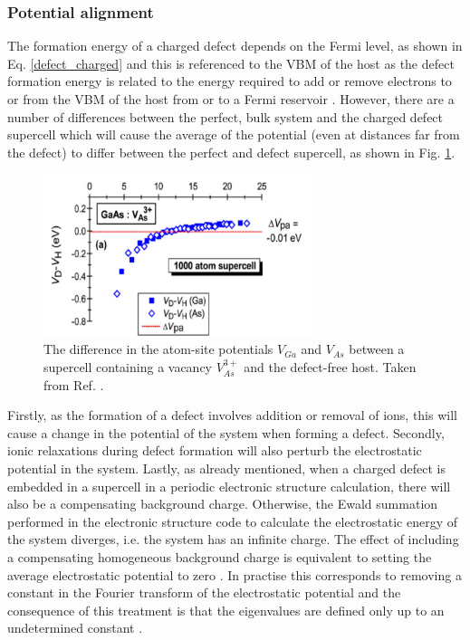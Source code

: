 \documentclass[11pt, twoside]{report}
\begin{document}
\subsubsection{Potential alignment}
The formation energy of a charged defect depends on the Fermi level, as shown in Eq. \ref{defect_charged} and this is referenced to the VBM of the host as the defect formation energy is related to the energy required to add or remove electrons to or from the VBM of the host from or to a Fermi reservoir \cite{Alex_defects}.
However, there are a number of differences between the perfect, bulk system and the charged defect supercell which will cause the average of the potential (even at distances far from the defect) to differ between the perfect and defect supercell, as shown in Fig. \ref{pa}.
\begin{figure}[h!]
  \centering
    \includegraphics[width=0.7\textwidth]{figures/pa.png}
    \caption[The difference in the atom-site potentials $V_{Ga}$ and $V_{As}$ between a supercell containing a vacancy $V_{As}^{3+}$ and the defect-free host.]{The difference in the atom-site potentials $V_{Ga}$ and $V_{As}$ between a supercell containing a vacancy $V_{As}^{3+}$ and the defect-free host. Taken from Ref. .}
  \label{pa}
\end{figure}

Firstly, as the formation of a defect involves addition or removal of ions, this will cause a change in the potential of the system when forming a defect. Secondly, ionic relaxations during defect formation will also perturb the electrostatic potential in the system. Lastly, as already mentioned, when a charged defect is embedded in a supercell in a periodic electronic structure calculation, there will also be a compensating background charge. Otherwise, the Ewald summation performed in the electronic structure code to calculate the electrostatic energy of the system diverges, i.e. the system has an infinite charge. The effect of including a compensating homogeneous background charge is equivalent to setting the average electrostatic potential to zero \cite{freysoldt_rev}. 
In practise this corresponds to removing a constant in the Fourier transform of the electrostatic potential and the consequence of this treatment is that the eigenvalues are defined only up to an undetermined constant \cite{kumagai_oba, kumagai_oba_9}.
\end{document}
